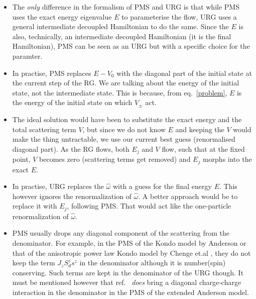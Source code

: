 \documentclass[twoside,11pt]{report}
\numberwithin{equation}{section}
\begin{document}
\begin{itemize}
\item The \textit{only} difference in the formalism of PMS and URG is that while PMS uses the exact energy eigenvalue \(E\) to parameterise the flow, URG uses a general intermediate decoupled Hamiltonian to do the same. Since the \(E\) is also, technically, an intermediate decoupled Hamiltonian (it is the final Hamiltonian), PMS can be seen as an URG but with a specific choice for the paramter.
\item In practise, PMS replaces \(E-V_0\) with the diagonal part of the initial state at the current step of the RG. We are talking about the energy of the initial state, not the intermediate state. This is because, from eq.~\ref{problem}, \(E\) is the energy of the initial state on which \(V_\pm\) act. 
\item The ideal solution would have been to substitute the exact energy and the total scattering term \(V\), but since we do not know \(E\) and keeping the \(V\) would make the thing untractable, we use our current best guess (renormalised diagonal part). As the RG flows, both \(E_j\) and \(V\) flow, such that at the fixed point, \(V\) becomes zero (scattering terms get removed) and \(E_j\) morphs into the exact \(E\). 
\item In practise, URG replaces the \(\hat \omega\) with a guess for the final energy \(E\). This however ignores the renormalization of \(\hat \omega\). A better approach would be to replace it with \(E_j\), following PMS. That would act like the one-particle renormalization of \(\hat \omega\).
\item PMS usually drops any diagonal component of the scattering from the denominator. For example, in the PMS of the Kondo model by Anderson \cite{Anderson} or that of the anisotropic power law Kondo model by Chenge et.al \cite{tatha}, they do not keep the term \(J_z S_d^z s^z\) in the denominator although it is number(spin) conserving. Such terms are kept in the denominator of the URG though. It must be mentioned however that ref.~\cite{raja} \textit{does} bring a diagonal charge-charge interaction in the denominator in the PMS of the extended Anderson model.
\end{itemize}
\end{document}
